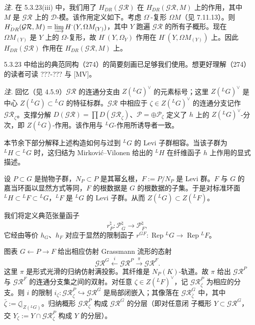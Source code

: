 \emph{注.} 在 5.3.23(iii) 中，我们用了 $H^{\cdot}_{DR}(\mathcal{GR})$ 在 $H^{\cdot}_{DR}(\mathcal{GR},M)$ 上的作用，其中 $M$ 是 $\mathcal{GR}$ 上的 $\mathcal{D}$-模。该作用定义如下。考虑 $\Omega^{\cdot}$-复形 $\Omega M$（见 7.11.13）。则 $H^{\cdot}_{DR}(\mathcal{GR},M)=\varinjlim H^{\cdot}(Y,\Omega M_{(Y)})$，其中 $Y$ 跑遍 $\mathcal{GR}$ 的所有子概形。现在 $\Omega M_{(Y)}$ 是 $Y$ 上的 $\Omega$-复形，故 $H^{\cdot}(Y,\Omega_Y)$ 作用在 $H^{\cdot}(Y,\Omega M_{(Y)})$ 上。因此 $H^{\cdot}_{DR}(\mathcal{GR})$ 作用在 $H^{\cdot}_{DR}(\mathcal{GR},M)$ 上。

 5.3.23 中给出的典范同构（274）的简要刻画已足够我们使用。想更好理解（274）的读者可读 ???-??? 与 [MV]。



\emph{注.} 回忆（见 4.5.9）$\mathcal{GR}$ 的连通分支由 $Z({}^{L}G)^{\vee}$ 的元素标号；这里 $Z({}^{L}G)^{\vee}$ 是中心 $Z({}^{L}G)\subset{}^{L}G$ 的特征标群。$\mathcal{GR}$ 中相应于 $\zeta\in Z({}^{L}G)^{\vee}$ 的连通分支记作 $\mathcal{GR}_{\zeta}$。支撑分解 $D(\mathcal{GR})=\prod D(\mathcal{GR}_{\zeta})$、$\mathcal{P}=\oplus\mathcal{P}_{\zeta}$ 定义了 $h$ 上的 $Z({}^{L}G)^{\vee}$-分次，即 $Z({}^{L}G)$-作用。该作用与 ${}^{L}G$-作用所诱导者一致。

本节余下部分解释上述构造如何与过到 ${}^{L}G$ 的 Levi 子群相容。当该子群为 ${}^{L}H\subset{}^{L}G$ 时，这归结为 Mirković–Vilonen 给出的 ${}^{L}H$ 在纤维函子 $h$ 上作用的显式描述。

 设 $P\subset G$ 是抛物子群，$N_P\subset P$ 是其幂幺根，$F:=P/N_P$ 是 Levi 群。$F$ 与 $G$ 的嘉当环面以显然方式等同，$F$ 的根数据是 $G$ 的根数据的子集。于是对标准环面 ${}^{L}H\subset{}^{L}F\subset{}^{L}G$，${}^{L}F$ 是 ${}^{L}G$ 的 Levi 子群。从而 $Z({}^{L}G)\subset Z({}^{L}F)$。

我们将定义典范张量函子
\begin{equation}\tag{278}
r_P^{\natural}:\mathcal{P}_G^{\natural}\to\mathcal{P}_F^{\natural},
\end{equation}
它经由等价 $h_G$、$h_F$ 对应于显然的限制函子 $r^{GF}:\operatorname{Rep}{}^{L}G\to\operatorname{Rep}{}^{L}F$。

 图表 $G\leftarrow P\rightarrow F$ 给出相应仿射 Grassmann 流形的态射
\begin{equation}\tag{279}
\mathcal{GR}^G\xleftarrow{i}\mathcal{GR}^P\xrightarrow{\pi}\mathcal{GR}^F.
\end{equation}
这里 $\pi$ 是形式光滑的归纳仿射满投影。其纤维是 $N_P(K)$-轨道。故 $\pi$ 给出 $\mathcal{GR}^P$ 与 $\mathcal{GR}^F$ 的连通分支集之间的双射。对任意 $\zeta\in Z({}^{L}F)^{\vee}$，记 $\mathcal{GR}^P_{\zeta}$ 为相应的分支。则 $i$ 的限制 $i_{\zeta}:\mathcal{GR}^P_{\zeta}\hookrightarrow\mathcal{GR}^G$ 是局部闭嵌入；其像落在 $\mathcal{GR}^G_{\bar{\zeta}}$ 中，其中 $\bar{\zeta}:=\zeta|_{Z({}^{L}G)}$。归纳概形 $\mathcal{GR}^P_{\zeta}$ 构成 $\mathcal{GR}^G$ 的分层（即对任意闭
子概形 $Y\subset\mathcal{GR}^G$，交 $Y_{\zeta}:=Y\cap\mathcal{GR}^P_{\zeta}$ 构成 $Y$ 的分层）。

